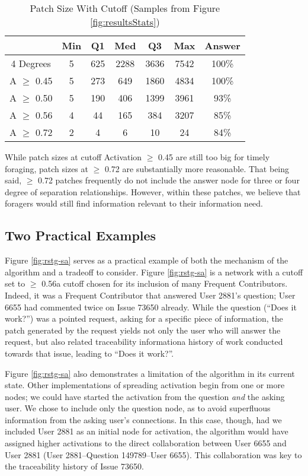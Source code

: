 \begin{table}[ht]
	\caption{Patch Size With Cutoff (Samples from Figure \ref{fig:resultsStats})}
	\centering
	\begin{tabular}{ |c||c|c|c|c|c||c|  }
		\hline
		& Min & Q1 & Med & Q3 & Max & Answer \\
		\hline
		4 Degrees & 5 & 625  & 2288 & 3636 & 7542 & 100\% \\
		A $\geq$ 0.45 & 5 & 273 & 649 & 1860 & 4834 & 100\% \\
		A $\geq$ 0.50 & 5 & 190 & 406 & 1399 & 3961 & 93\% \\
		A $\geq$ 0.56 & 4 & 44  & 165 & 384  & 3207 & 85\% \\
		A $\geq$ 0.72 & 2 & 4 & 6 & 10 & 24 & 84\% \\
		\hline
	\end{tabular}
	\label{tab:resultsStats}
\end{table}


While patch sizes at cutoff Activation $\geq$ 0.45 are still too big for timely foraging, patch sizes at $\geq$ 0.72 are substantially more reasonable. That being said, $\geq$ 0.72 patches frequently do not include the answer node for three or four degree of separation relationships. However, within these patches, we believe that foragers would still find information relevant to their information need.

\subsection{Two Practical Examples}
Figure \ref{fig:rstg-sa} serves as a practical example of both the mechanism of the algorithm and a tradeoff to consider. Figure \ref{fig:rstg-sa} is a network with a cutoff set to $\geq$ 0.56\textemdash a cutoff chosen for its inclusion of many Frequent Contributors. Indeed, it was a Frequent Contributor that answered User 2881's question; User 6655 had commented twice on Issue 73650 already. While the question (``Does it work?'') was a pointed request, asking for a specific piece of information, the patch generated by the request yields not only the user who will answer the request, but also related traceability information\textemdash a history of work conducted towards that issue, leading to ``Does it work?''.

Figure \ref{fig:rstg-sa} also demonstrates a limitation of the algorithm in its current state. Other implementations of spreading activation begin from one or more nodes; we could have started the activation from the question \textit{and} the asking user. We chose to include only the question node, as to avoid superfluous information from the asking user's connections. In this case, though, had we included User 2881 as an initial node for activation, the algorithm would have assigned higher activations to the direct collaboration between User 6655 and User 2881 (User 2881--Question 149789--User 6655). This collaboration was key to the traceability history of Issue 73650.

